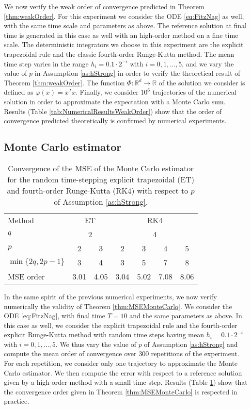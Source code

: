 \documentclass{siamart1116}
\numberwithin{theorem}{section}
\renewcommand{\phi}{\varphi}
\newcommand{\R}{\mathbb{R}}
\begin{document}
We now verify the weak order of convergence predicted in Theorem \ref{thm:weakOrder}. For this experiment we consider the ODE \eqref{eq:FitzNag} as well, with the same time scale and parameters as above. The reference solution at final time is generated in this case as well with an high-order method on a fine time scale. The deterministic integrators we choose in this experiment are the explicit trapezoidal rule and the classic fourth-order Runge-Kutta method. The mean time step varies in the range $h_i = 0.1\cdot 2^{-i}$ with $i = 0, 1, \ldots, 5$, and we vary the value of $p$ in Assumption \ref{as:hStrong} in order to verify the theoretical result of Theorem \ref{thm:weakOrder}. The function $\Phi\colon\R^d\to\R$ of the solution we consider is defined as $\phi(x) = x^Tx$. Finally, we consider $10^6$ trajectories of the numerical solution in order to approximate the expectation with a Monte Carlo sum. Results (Table \ref{tab:NumericalResultsWeakOrder}) show that the order of convergence predicted theoretically is confirmed by numerical experiments. 

\subsection{Monte Carlo estimator}

\begin{table}[t!]
	\centering
	\begin{tabular}{lcccccc}
		\toprule
		Method & \multicolumn{2}{c}{ET} & \multicolumn{4}{c}{RK4} \\ 
		\cmidrule(l{2pt}r{2pt}){2-3} \cmidrule(l{2pt}r{2pt}){4-7} 
		$q$ & \multicolumn{2}{c}{2} & \multicolumn{4}{c}{4} \\
		$p$ & 2 & 3 & 2 & 3 & 4 & 5\\
		$\min\{2q, 2p - 1\}$ & 3 & 4 & 3 & 5 & 7 & 8\\
		MSE order & 3.01 & 4.05 & 3.04 & 5.02 & 7.08 & 8.06\\
		\bottomrule
	\end{tabular}
	\caption{Convergence of the MSE of the Monte Carlo estimator for the random time-stepping explicit trapezoidal (ET) and fourth-order Runge-Kutta (RK4) with respect to $p$ of Assumption \ref{as:hStrong}.}
	\label{tab:NumericalResultsMSE}
\end{table}

In the same spirit of the previous numerical experiments, we now verify numerically the validity of Theorem \ref{thm:MSEMonteCarlo}. We consider the ODE \eqref{eq:FitzNag}, with final time $T = 10$ and the same parameters as above. In this case as well, we consider the explicit trapezoidal rule and the fourth-order explicit Runge-Kutta method with random time steps having mean $h_i = 0.1\cdot 2^{-i}$ with $i = 0, 1, \ldots, 5$. We thus vary the value of $p$ of Assumption \ref{as:hStrong} and compute the mean order of convergence over 300 repetitions of the experiment. For each repetition, we consider only one trajectory to approximate the Monte Carlo estimator. We then compute the error with respect to a reference solution given by a high-order method with a small time step. Results (Table \ref{tab:NumericalResultsMSE}) show that the convergence order given in Theorem \ref{thm:MSEMonteCarlo} is respected in practice.




\end{document}
